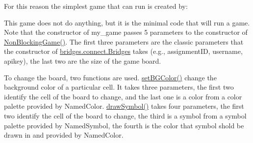 For this reason the simplest game that can run is created by\+:


\begin{DoxyCode}{0}
\DoxyCodeLine{  \}}
\DoxyCodeLine{\}}
\end{DoxyCode}


This game does not do anything, but it is the minimal code that will run a game. Note that the constructor of my\+\_\+game passes 5 parameters to the constructor of \mbox{\hyperlink{classbridges_1_1games_1_1_non_blocking_game_ae85ea8dcc355372ba354f4e26323fb76}{Non\+Blocking\+Game()}}. The first three parameters are the classic parameters that the constructor of \mbox{\hyperlink{classbridges_1_1connect_1_1_bridges}{bridges.\+connect.\+Bridges}} takes (e.\+g., assignment\+ID, username, apikey), the last two are the size of the game board.

To change the board, two functions are used. \mbox{\hyperlink{classbridges_1_1games_1_1_game_base_ac9a231dd4425eb0f9dea2377653b23c4}{set\+B\+G\+Color()}} change the background color of a particular cell. It takes three parameters, the first two identify the cell of the board to change, and the last one is a color from a color palette provided by Named\+Color. \mbox{\hyperlink{classbridges_1_1games_1_1_game_base_a7dd4caecd0522dcf7fc275517fbc695d}{draw\+Symbol()}} takes four parameters, the first two identify the cell of the board to change, the third is a symbol from a symbol palette provided by Named\+Symbol, the fourth is the color that symbol shold be drawn in and provided by Named\+Color.

